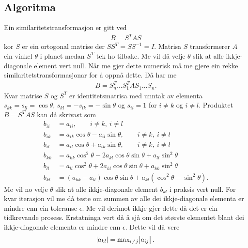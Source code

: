 \documentclass[11pt, a4paper]{article}
\begin{document}
  \subsection{Algoritma}
    Ein similaritetstransformasjon er gitt ved 
    \begin{align*}
      B = S^TAS
    \end{align*}
    kor $S$ er ein ortogonal matrise der $SS^T = SS^{-1} = I$. Matrisa $S$ transformerer $A$ ein vinkel $\theta$ i planet medan $S^T$ tek ho tilbake.
    Me vil då velje $\theta$ slik at alle ikkje-diagonale element vert null. Når me gjer dette numerisk må me gjere ein rekke similaritetstransformasjonar 
    for å oppnå dette. Då har me
    \begin{align*}
      B = S_n^T \dots S_1^TAS_1 \dots S_n.
    \end{align*}
    Kvar matrise $S$ og $S^T$ er identitetsmatrisa med unntak av elementa $s_{kk} = s_{ll} = \cos{\theta}$, $s_{kl} = -s_{lk} = -\sin{\theta}$ og 
    $s_{ii} = 1$ for $i \ne k$ og $i \ne l$. Produktet $B = S^TAS$ kan då skrivast som
    \begin{align*}
      b_{ii} &= a_{ii}, \qquad i \ne k, \ i \ne l \\
      b_{ik} &= a_{ik}\cos{\theta} - a_{il}\sin{\theta}, \qquad i \ne k, \ i \ne l \\
      b_{il} &= a_{il}\cos{\theta} + a_{ik}\sin{\theta}, \qquad i \ne k, \ i \ne l \\
      b_{kk} &= a_{kk}\cos^2{\theta} - 2a_{kl}\cos{\theta}\sin{\theta} + a_{ll}\sin^2{\theta} \\
      b_{ll} &= a_{ll}\cos^2{\theta} + 2a_{kl}\cos{\theta}\sin{\theta} + a_{kk}\sin^2{\theta} \\
      b_{kl} &= (a_{kk} - a_{ll})\cos{\theta}\sin{\theta} + a_{kl}(\cos^2{\theta} - \sin^2{\theta}).
    \end{align*}
    Me vil no velje $\theta$ slik at alle ikkje-diagonale element $b_{kl}$ i praksis vert null. For kvar iterasjon vil me då teste om summen av alle 
    dei ikkje-diagonale elementa er mindre enn ein toleranse $\epsilon$. Me vil derimot ikkje gjer dette då det er ein tidkrevande prosess. 
    Erstatninga vert då å sjå om det største elementet blant dei ikkje-diagonale elementa er mindre enn $\epsilon$. Dette vil då vere
    \begin{align*}
      \abs{a_{kl}} = \text{max}_{i \ne j}\abs{a_{ij}}.
    \end{align*}
\end{document}
